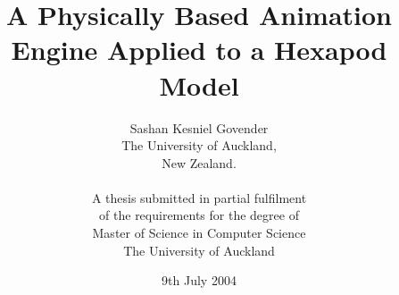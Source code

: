 \documentclass[12pt,pdftex,colorlinks]{book}
\begin{document}
\frontmatter
\lstset{basicstyle=\small}
\title{A Physically Based Animation Engine Applied to a Hexapod Model}
\date{9th July 2004}
\author{Sashan Kesniel Govender\\
The University of Auckland, \\
New Zealand.\\
\\
A thesis submitted in partial fulfilment \\
of the requirements for the degree of\\
Master of Science in Computer Science\\
The University of Auckland\\
} 
\maketitle
\newpage
\tableofcontents
\listoffigures
\newpage


\mainmatter





\appendix




\end{document}
